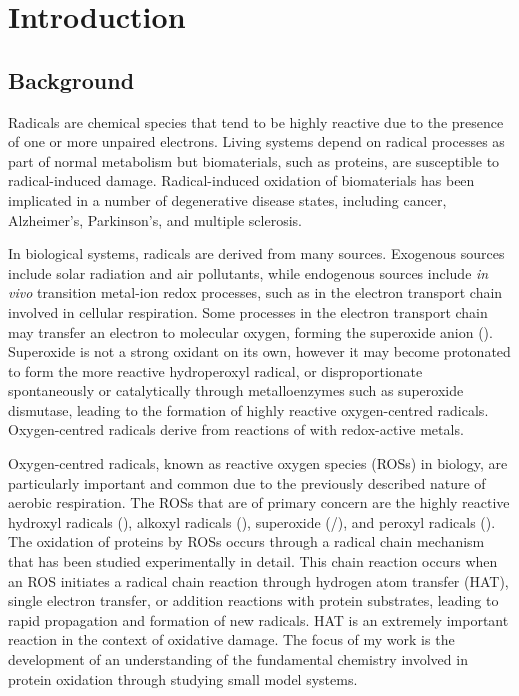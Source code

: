 
\chapter{Introduction}
\label{ch:intro}
\begin{doublespace}
\section{Background}

Radicals are chemical species that tend to be highly reactive due to the
presence of one or more unpaired electrons. Living systems depend on radical
processes as part of normal metabolism\cite{Halliwell2015} but biomaterials,
such as proteins, are susceptible to radical-induced damage. Radical-induced
oxidation of biomaterials has been implicated in a number of degenerative
disease states, including cancer, Alzheimer's, Parkinson's, and multiple
sclerosis.\cite{Barnham2004, Valko2007, Hwang2013, Halliwell2007}

In biological systems, radicals are derived from many sources. Exogenous sources
include solar radiation and air pollutants, while endogenous sources include
\emph{in vivo} transition metal-ion redox processes, such as in the electron
transport chain involved in cellular respiration.\cite{Turrens2003} Some
processes in the electron transport chain may transfer an electron to molecular
oxygen, forming the superoxide anion (). Superoxide is not a strong
oxidant on its own, however it may become protonated to form the more reactive
hydroperoxyl radical,\cite{Kozmer2014} or disproportionate spontaneously or
catalytically through metalloenzymes such as superoxide dismutase, leading to
the formation of highly reactive oxygen-centred radicals. Oxygen-centred
radicals derive from reactions of  with redox-active
metals.\cite{Halliwell2015}

Oxygen-centred radicals, known as reactive oxygen species (ROSs) in biology, are
particularly important and common due to the previously described nature of
aerobic respiration. The ROSs that are of primary concern are the highly
reactive hydroxyl radicals (), alkoxyl radicals (), superoxide
(/), and peroxyl radicals
().\cite{Halliwell2015} The oxidation of proteins by ROSs occurs
through a radical chain mechanism that has been studied experimentally in
detail.\cite{Berlett1997, Davies2016} This chain reaction occurs when an ROS
initiates a radical chain reaction through hydrogen atom transfer (HAT), single
electron transfer, or addition reactions with protein substrates, leading to
rapid propagation and formation of new radicals. HAT is an extremely important
reaction in the context of oxidative damage. The focus of my work is the
development of an understanding of the fundamental chemistry involved in protein
oxidation through studying small model systems.


\end{doublespace}
